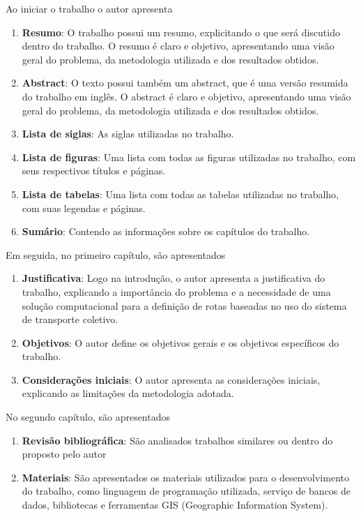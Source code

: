 \documentclass[
    article,
    12pt,
    a4paper,
    english,
    brazil,
    sumario=tradicional
]{/home/lucas_galdino/Desktop/TCC/planning/abntex2/abntex2}
\begin{document}
Ao iniciar o trabalho o autor apresenta
\begin{enumerate}
    \item \textbf{Resumo}: O trabalho possui um resumo, explicitando o que será discutido dentro do trabalho. O resumo é claro e objetivo,
          apresentando uma visão geral do problema, da metodologia utilizada e dos resultados obtidos.
    \item \textbf{Abstract}: O texto possui também um abstract, que é uma versão resumida do trabalho em inglês. O abstract é claro e objetivo, apresentando uma visão geral do problema, da metodologia utilizada e dos resultados obtidos.
    \item \textbf{Lista de siglas}: As siglas utilizadas no trabalho.
    \item \textbf{Lista de figuras}: Uma lista com todas as figuras utilizadas no trabalho, com seus respectivos títulos e páginas.
    \item \textbf{Lista de tabelas}: Uma lista com todas as tabelas utilizadas no trabalho, com suas legendas e páginas.
    \item \textbf{Sumário}: Contendo as informações sobre os capítulos do trabalho.
\end{enumerate}\par

Em seguida, no primeiro capítulo, são apresentados
\begin{enumerate}
    \item \textbf{Justificativa}: Logo na introdução, o autor apresenta a justificativa do trabalho, explicando a importância do problema e a necessidade de uma solução computacional para a definição de rotas baseadas no uso do sistema de transporte coletivo.
    \item \textbf{Objetivos}: O autor define os objetivos gerais e os objetivos específicos do trabalho.
    \item \textbf{Considerações iniciais}: O autor apresenta as considerações iniciais, explicando as limitações da metodologia adotada.
\end{enumerate} \par

No segundo capítulo, são apresentados
\begin{enumerate}
    \item \textbf{Revisão bibliográfica}: São analisados trabalhos similares ou dentro do proposto pelo autor
    \item \textbf{Materiais}: São apresentados os materiais utilizados para o desenvolvimento do trabalho, como linguagem de programação utilizada, serviço de bancos de dados, bibliotecas e ferramentas GIS (Geographic Information System).
\end{enumerate}\par
\end{document}
